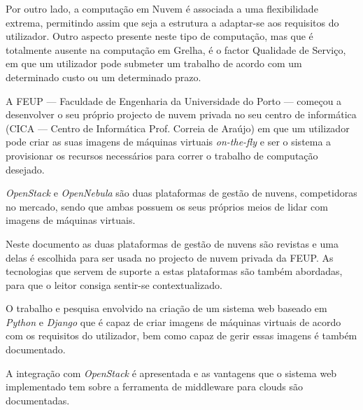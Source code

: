 Por outro lado, a computação em Nuvem é associada a uma flexibilidade extrema, permitindo assim que seja a estrutura a adaptar-se aos requisitos do utilizador. Outro aspecto presente neste tipo de computação, mas que é totalmente ausente na computação em Grelha, é o factor Qualidade de Serviço, em que um utilizador pode submeter um trabalho de acordo com um determinado custo ou um determinado prazo.

A FEUP --- Faculdade de Engenharia da Universidade do Porto --- começou a desenvolver o seu próprio projecto de nuvem privada no seu centro de informática (CICA --- Centro de Informática Prof. Correia de Araújo) em que um utilizador pode criar as suas imagens de máquinas virtuais \textit{on-the-fly} e ser o sistema a provisionar os recursos necessários para correr o trabalho de computação desejado.

\textit{OpenStack} e \textit{OpenNebula} são duas plataformas de gestão de nuvens, competidoras no mercado, sendo que ambas possuem os seus próprios meios de lidar com imagens de máquinas virtuais.

Neste documento as duas plataformas de gestão de nuvens são revistas e uma delas é escolhida para ser usada no projecto de nuvem privada da FEUP. As tecnologias que servem de suporte a estas plataformas são também abordadas, para que o leitor consiga sentir-se contextualizado.

O trabalho e pesquisa envolvido na criação de um sistema web baseado em \textit{Python} e \textit{Django} que é capaz de criar imagens de máquinas virtuais de acordo com os requisitos do utilizador, bem como capaz de gerir essas imagens é também documentado.

A integração com \textit{OpenStack} é apresentada e as vantagens que o sistema web implementado tem sobre a ferramenta de middleware para clouds são documentadas.

